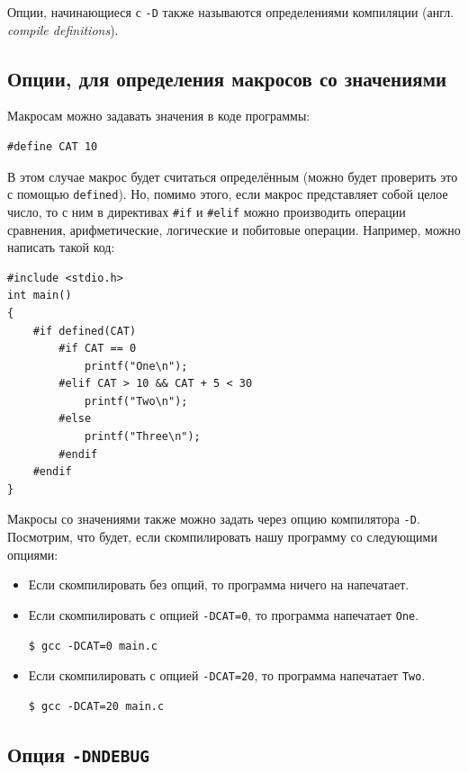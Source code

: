 \documentclass{article}
\begin{document}
Опции, начинающиеся с \texttt{-D} также называются определениями компиляции (англ. \textit{compile definitions}). 


\subsection*{Опции, для определения макросов со значениями}
Макросам можно задавать значения в коде программы:
\begin{lstlisting}[style=csMiptCppStyle]
#define CAT 10
\end{lstlisting}
В этом случае макрос будет считаться определённым (можно будет проверить это с помощью \texttt{defined}). Но, помимо этого, если макрос представляет собой целое число, то с ним в директивах \texttt{\#if} и \texttt{\#elif} можно производить операции сравнения, арифметические, логические и побитовые операции. Например, можно написать такой код:
\begin{lstlisting}[style=csMiptCppStyle]
#include <stdio.h>
int main()
{
    #if defined(CAT)
        #if CAT == 0
            printf("One\n");
        #elif CAT > 10 && CAT + 5 < 30
            printf("Two\n");
        #else
            printf("Three\n");
        #endif
    #endif
}
\end{lstlisting}
Макросы со значениями также можно задать через опцию компилятора \texttt{-D}.
Посмотрим, что будет, если скомпилировать нашу программу со следующими опциями:
\begin{itemize}
\item Если скомпилировать без опций, то программа ничего на напечатает.

\item Если скомпилировать с опцией \texttt{-DCAT=0}, то программа напечатает \texttt{One}.
\begin{lstlisting}[style=csMiptBash]
$ gcc -DCAT=0 main.c
\end{lstlisting}

\item Если скомпилировать с опцией \texttt{-DCAT=20}, то программа напечатает \texttt{Two}.
\begin{lstlisting}[style=csMiptBash]
$ gcc -DCAT=20 main.c
\end{lstlisting}
\end{itemize}


\subsection*{Опция \texttt{-DNDEBUG}}
\end{document}
